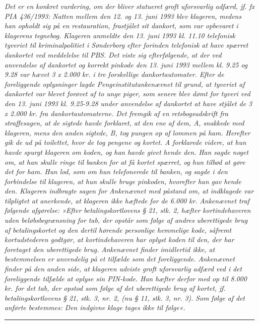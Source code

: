 \documentclass[]{book}
\begin{document}
\emph{Det er en konkret vurdering, om der bliver statueret groft uforsvarlig adfærd, jf. fx PIA 436/1993: Natten mellem den 12. og 13. juni 1993 blev klageren, medens han opholdt sig på en restauration, frastjålet sit dankort, som var opbevaret i klagerens tegnebog. Klageren anmeldte den 13. juni 1993 kl. 11.10 telefonisk tyveriet til kriminalpolitiet i Sønderborg efter forinden telefonisk at have spærret dankortet ved meddelelse til PBS. Det viste sig efterfølgende, at der ved anvendelse af dankortet og korrekt pinkode den 13. juni 1993 mellem kl. 9.25 og 9.28 var hævet 3 x 2.000 kr. i tre forskellige dankortautomater. Efter de foreliggende oplysninger lagde Pengeinstitutankenævnet til grund, at tyveriet af dankortet var blevet forøvet af to unge piger, som senere blev dømt for tyveri ved den 13. juni 1993 kl. 9.25-9.28 under anvendelse af dankortet at have stjålet de 3 x 2.000 kr. fra dankortautomaterne. Det fremgik af en retsbogsudskrift fra straffesagen, at de sigtede havde forklaret, at den ene af dem, A, snakkede med klageren, mens den anden sigtede, B, tog pungen op af lommen på ham. Herefter gik de ud på toilettet, hvor de tog pengene og kortet. A forklarede videre, at hun havde spurgt klageren om koden, og han havde givet hende den. Han sagde noget om, at han skulle ringe til banken for at få kortet spærret, og hun tilbød at gøre det for ham. Hun lod, som om hun telefonerede til banken, og sagde i den forbindelse til klageren, at hun skulle bruge pinkoden, hvorefter han gav hende den. Klageren indbragte sagen for Ankenævnet med påstand om, at indklagede var tilpligtet at anerkende, at klageren ikke hæftede for de 6.000 kr. Ankenævnet traf følgende afgørelse: »Efter betalingskortlovens § 21, stk. 2, hæfter kortindehaveren uden beløbsbegrænsning for tab, der opstår som følge af andres uberettigede brug af betalingskortet og den dertil hørende personlige hemmelige kode, såfremt kortudstederen godtgør, at kortindehaveren har oplyst koden til den, der har foretaget den uberettigede brug. Ankenævnet finder imidlertid ikke, at bestemmelsen er anvendelig på et tilfælde som det foreliggende. Ankenævnet finder på den anden side, at klageren udviste groft uforsvarlig adfærd ved i det foreliggende tilfælde at oplyse sin PIN-kode. Han hæfter derfor med op til 8.000 kr. for det tab, der opstod som følge af det uberettigede brug af kortet, jf. betalingskortlovens § 21, stk. 3, nr. 2, (nu § 11, stk. 3, nr. 3). Som følge af det anførte bestemmes: Den indgivne klage tages ikke til følge«.}

\begin{center}\rule{0.5\linewidth}{\linethickness}\end{center}
\end{document}
